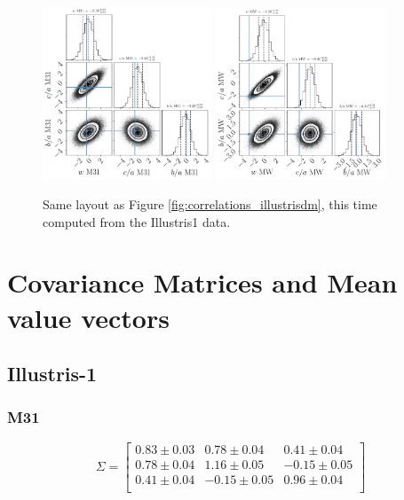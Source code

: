 \documentclass[a4paper,fleqn,usenatbib]{mnras}
\begin{document}
\begin{figure}
\centering
\includegraphics[width=0.45\textwidth]{gaussian_model_illustris_M31.pdf}
\includegraphics[width=0.45\textwidth]{gaussian_model_illustris_MW.pdf}
\caption{
Same layout as Figure \ref{fig:correlations_illustrisdm}, this time
computed from the Illustris1 data.
\label{fig:correlations_illustris}}
\end{figure}


\newpage
\newpage
\section{Covariance Matrices and Mean value vectors}
\subsection{Illustris-1}

\subsubsection{M31}

\[
\Sigma= 
\begin{bmatrix}
0.83\pm 0.03  & 0.78\pm 0.04  & 0.41\pm 0.04\\
0.78\pm 0.04  & 1.16\pm 0.05 & -0.15\pm 0.05\\
0.41\pm 0.04 & -0.15\pm 0.05 & 0.96\pm 0.04\\
\end{bmatrix}
\]
\end{document}

